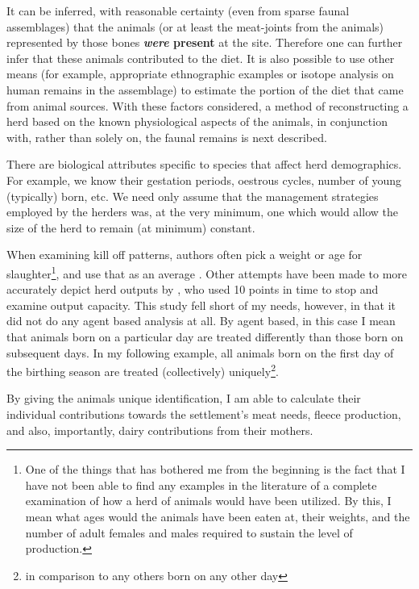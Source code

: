 It can be inferred, with reasonable certainty (even from sparse faunal assemblages) that the animals (or at least the meat-joints from the animals) represented by those bones \textbf{\textit{were} present} at the site. Therefore one can further infer that these animals contributed to the diet.  
It is also possible to use other means  (for example, appropriate ethnographic examples or isotope analysis on human remains in the assemblage) to estimate the portion of the diet that came from animal sources.  With these factors considered, a method of reconstructing a herd based on the known physiological aspects of the animals, in conjunction with, rather than solely on, the faunal remains is next described.  

There are biological attributes specific to species that affect herd demographics. %
For example, we know their gestation periods, oestrous cycles, number of young (typically) born, etc.  We need only assume that the management strategies employed by the herders was, at the very minimum, one which would allow the size of the herd to remain (at minimum) constant. %

When examining kill off patterns, authors often pick a weight or age for slaughter\footnote{One of the things that has bothered me from the beginning is the fact that I have not been able to find any examples in the literature of a complete examination of how a herd of animals would have been utilized.  By this, I mean what ages would the animals have been eaten at, their weights, and the number of adult females and males required to sustain the level of production.}, and use that as an average \citep{Danti2000}.  Other attempts have been made to more accurately depict herd outputs by \cite{Cribb1984}, who used 10 points in time to stop and examine output capacity.  This study fell short of my needs, however, in that it did not do any agent based analysis at all.  By agent based, in this case I mean that animals born on a particular day are treated differently than those born on subsequent days.  In my following example, all animals born on the first day of the birthing season are treated (collectively) uniquely\footnote{in comparison to any others born on any other day}.

By giving the animals unique identification, I am able to calculate their individual contributions towards the settlement's meat needs, fleece production, and also, importantly, dairy contributions from their mothers.

